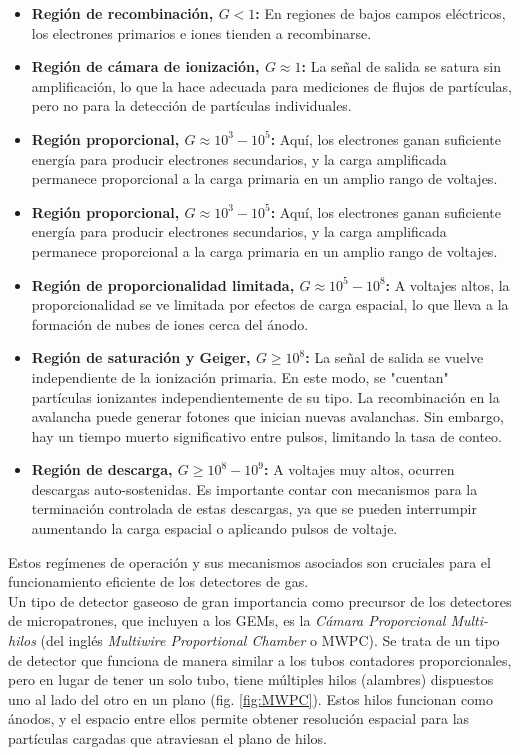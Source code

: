 \documentclass[]{book}
\begin{document}
\begin{itemize}
    \item \textbf{Región de recombinación, \(G < 1\):} En regiones de bajos campos eléctricos, los electrones primarios e iones tienden a recombinarse.
    \item \textbf{Región de cámara de ionización, \(G \approx 1\):} La señal de salida se satura sin amplificación, lo que la hace adecuada para mediciones de flujos de partículas, pero no para la detección de partículas individuales.
    \item \textbf{Región proporcional, \(G \approx 10^3 - 10^5\):} Aquí, los electrones ganan suficiente energía para producir electrones secundarios, y la carga amplificada permanece proporcional a la carga primaria en un amplio rango de voltajes.
    \item \textbf{Región proporcional, \(G \approx 10^3 - 10^5\):} Aquí, los electrones ganan suficiente energía para producir electrones secundarios, y la carga amplificada permanece proporcional a la carga primaria en un amplio rango de voltajes.
    \item \textbf{Región de proporcionalidad limitada, \(G \approx 10^5 - 10^8\):} A voltajes altos, la proporcionalidad se ve limitada por efectos de carga espacial, lo que lleva a la formación de nubes de iones cerca del ánodo.
    \item \textbf{Región de saturación y Geiger, \(G \geq 10^8\):} La señal de salida se vuelve independiente de la ionización primaria. En este modo, se "cuentan" partículas ionizantes independientemente de su tipo. La recombinación en la avalancha puede generar fotones que inician nuevas avalanchas. Sin embargo, hay un tiempo muerto significativo entre pulsos, limitando la tasa de conteo.
    \item \textbf{Región de descarga, \(G \geq 10^8 - 10^9\):} A voltajes muy altos, ocurren descargas auto-sostenidas. Es importante contar con mecanismos para la terminación controlada de estas descargas, ya que se pueden interrumpir aumentando la carga espacial o aplicando pulsos de voltaje.
\end{itemize}

\noindent Estos regímenes de operación y sus mecanismos asociados son cruciales para el funcionamiento eficiente de los detectores de gas.\\

\noindent Un tipo de detector gaseoso de gran importancia como precursor de los detectores de micropatrones, que incluyen a los GEMs, es la \textit{Cámara Proporcional Multi-hilos} (del inglés \textit{Multiwire Proportional Chamber} o MWPC). Se trata de un tipo de detector que funciona de manera similar a los tubos contadores proporcionales, pero en lugar de tener un solo tubo, tiene múltiples hilos (alambres) dispuestos uno al lado del otro en un plano (fig. \ref{fig:MWPC}). Estos hilos funcionan como ánodos, y el espacio entre ellos permite obtener resolución espacial para las partículas cargadas que atraviesan el plano de hilos.
\end{document}
